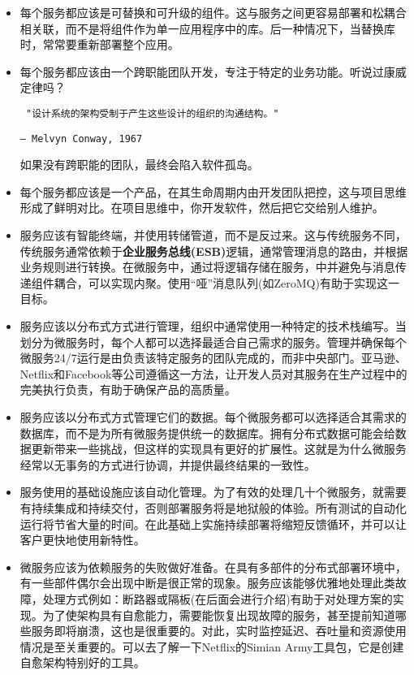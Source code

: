 \begin{itemize}
\item	
每个服务都应该是可替换和可升级的组件。这与服务之间更容易部署和松耦合相关联，而不是将组件作为单一应用程序中的库。后一种情况下，当替换库时，常常要重新部署整个应用。

\item
每个服务都应该由一个跨职能团队开发，专注于特定的业务功能。听说过康威定律吗？

\begin{flushleft}
\tt
"设计系统的架构受制于产生这些设计的组织的沟通结构。"
\end{flushleft}
\begin{flushright}
\texttt{– Melvyn Conway, 1967}
\end{flushright}

如果没有跨职能的团队，最终会陷入软件孤岛。

\item
每个服务都应该是一个产品，在其生命周期内由开发团队把控，这与项目思维形成了鲜明对比。在项目思维中，你开发软件，然后把它交给别人维护。

\item
服务应该有智能终端，并使用转储管道，而不是反过来。这与传统服务不同，传统服务通常依赖于\textbf{企业服务总线(ESB)}逻辑，通常管理消息的路由，并根据业务规则进行转换。在微服务中，通过将逻辑存储在服务，中并避免与消息传递组件耦合，可以实现内聚。使用“哑”消息队列(如ZeroMQ)有助于实现这一目标。

\item
服务应该以分布式方式进行管理，组织中通常使用一种特定的技术栈编写。当划分为微服务时，每个人都可以选择最适合自己需求的服务。管理并确保每个微服务24/7运行是由负责该特定服务的团队完成的，而非中央部门。亚马逊、Netflix和Facebook等公司遵循这一方法，让开发人员对其服务在生产过程中的完美执行负责，有助于确保产品的高质量。

\item
服务应该以分布式方式管理它们的数据。每个微服务都可以选择适合其需求的数据库，而不是为所有微服务提供统一的数据库。拥有分布式数据可能会给数据更新带来一些挑战，但这样的实现具有更好的扩展性。这就是为什么微服务经常以无事务的方式进行协调，并提供最终结果的一致性。

\item
服务使用的基础设施应该自动化管理。为了有效的处理几十个微服务，就需要有持续集成和持续交付，否则部署服务将是地狱般的体验。所有测试的自动化运行将节省大量的时间。在此基础上实施持续部署将缩短反馈循环，并可以让客户更快地使用新特性。

\item
微服务应该为依赖服务的失败做好准备。在具有多部件的分布式部署环境中，有一些部件偶尔会出现中断是很正常的现象。服务应该能够优雅地处理此类故障，处理方式例如：断路器或隔板(在后面会进行介绍)有助于对处理方案的实现。为了使架构具有自愈能力，需要能恢复出现故障的服务，甚至提前知道哪些服务即将崩溃，这也是很重要的。对此，实时监控延迟、吞吐量和资源使用情况是至关重要的。可以去了解一下Netflix的Simian Army工具包，它是创建自愈架构特别好的工具。


\end{itemize}
